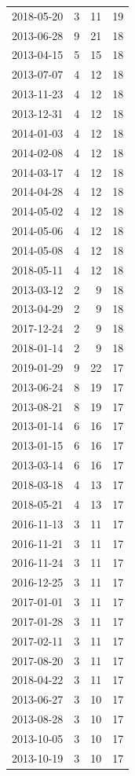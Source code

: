 \begin{tabular}{lrrr}
2018-05-20 & 3 & 11 & 19 \\
2013-06-28 & 9 & 21 & 18 \\
2013-04-15 & 5 & 15 & 18 \\
2013-07-07 & 4 & 12 & 18 \\
2013-11-23 & 4 & 12 & 18 \\
2013-12-31 & 4 & 12 & 18 \\
2014-01-03 & 4 & 12 & 18 \\
2014-02-08 & 4 & 12 & 18 \\
2014-03-17 & 4 & 12 & 18 \\
2014-04-28 & 4 & 12 & 18 \\
2014-05-02 & 4 & 12 & 18 \\
2014-05-06 & 4 & 12 & 18 \\
2014-05-08 & 4 & 12 & 18 \\
2018-05-11 & 4 & 12 & 18 \\
2013-03-12 & 2 & 9 & 18 \\
2013-04-29 & 2 & 9 & 18 \\
2017-12-24 & 2 & 9 & 18 \\
2018-01-14 & 2 & 9 & 18 \\
2019-01-29 & 9 & 22 & 17 \\
2013-06-24 & 8 & 19 & 17 \\
2013-08-21 & 8 & 19 & 17 \\
2013-01-14 & 6 & 16 & 17 \\
2013-01-15 & 6 & 16 & 17 \\
2013-03-14 & 6 & 16 & 17 \\
2018-03-18 & 4 & 13 & 17 \\
2018-05-21 & 4 & 13 & 17 \\
2016-11-13 & 3 & 11 & 17 \\
2016-11-21 & 3 & 11 & 17 \\
2016-11-24 & 3 & 11 & 17 \\
2016-12-25 & 3 & 11 & 17 \\
2017-01-01 & 3 & 11 & 17 \\
2017-01-28 & 3 & 11 & 17 \\
2017-02-11 & 3 & 11 & 17 \\
2017-08-20 & 3 & 11 & 17 \\
2018-04-22 & 3 & 11 & 17 \\
2013-06-27 & 3 & 10 & 17 \\
2013-08-28 & 3 & 10 & 17 \\
2013-10-05 & 3 & 10 & 17 \\
2013-10-19 & 3 & 10 & 17 \\

\end{tabular}

